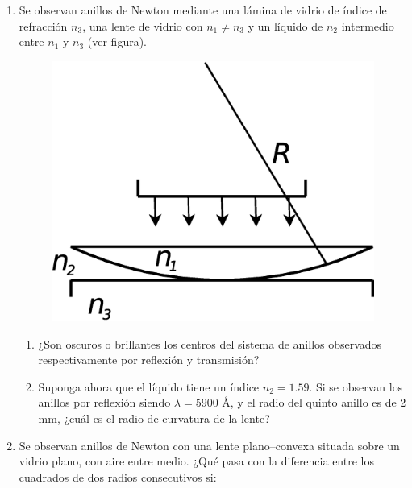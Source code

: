 \documentclass[11pt,spanish]{article}
\begin{document}
\begin{enumerate}

    \item Se observan anillos de Newton mediante una lámina de vidrio de índice
    de refracción $n_{3}$, una lente de vidrio con $n_{1}\ne n_{3}$
    y un líquido de $n_{2}$ intermedio entre $n_{1}$ y $n_{3}$ (ver
    figura). 

    \begin{figure}[H]
        \centering{}
        \includegraphics[clip,scale=0.25]{figs/ej5-26}
    \end{figure}

    \begin{enumerate}
        \item ¿Son oscuros o brillantes los centros del sistema de anillos
        observados respectivamente por reflexión y transmisión? 

        \item Suponga ahora que el líquido tiene un índice $n_{2}=1.59$. Si se
        observan los anillos por reflexión siendo $\lambda=5900$ Å, y el
        radio del quinto anillo es de 2 mm, ¿cuál es el radio de curvatura
        de la lente?
    \end{enumerate}
    

    \item Se observan anillos de Newton con una lente plano--convexa situada
    sobre un vidrio plano, con aire entre medio. ¿Qué pasa con la diferencia
    entre los cuadrados de dos radios consecutivos si: 


\end{enumerate}
\end{document}
